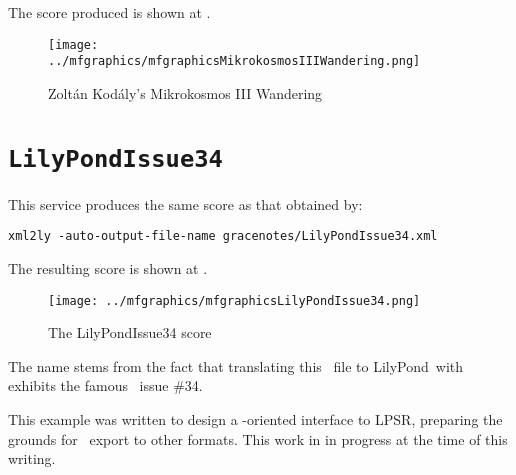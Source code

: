 The score produced is shown at .
\begin{figure}[htbp]
\begin{center}
\texttt{[image: ../mfgraphics/mfgraphicsMikrokosmosIIIWandering.png]}
\caption{Zoltán Kodály's Mikrokosmos III Wandering}
\label{Zoltán Kodály's Mikrokosmos III Wandering}
\end{center}
\end{figure}


\section{{\tt LilyPondIssue34}}

This service produces the same score as that obtained by:
\begin{lstlisting}[language=CPlusPlus]
xml2ly -auto-output-file-name gracenotes/LilyPondIssue34.xml
\end{lstlisting}

The resulting score is shown at .
\begin{figure}[htbp]
\begin{center}
\texttt{[image: ../mfgraphics/mfgraphicsLilyPondIssue34.png]}
\caption{The LilyPondIssue34 score}
\label{The LilyPondIssue34 score}
\end{center}
\end{figure}

The name  stems from the fact that translating this \mxml\ file to LilyPond\ with \fileName{\mxmlToLy} exhibits the famous \lily\ issue \#34.

This example was written to design a \lily-oriented interface to LPSR, preparing the grounds for \lily\ export to other formats. This work in in progress at the time of this writing.

